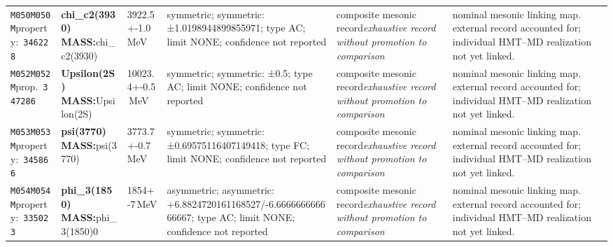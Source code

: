 \begin{landscape}
\begin{longtable}{L{1.85cm}L{4.45cm}L{2.35cm}L{4.05cm}L{3.35cm}L{7.15cm}}
\texttt{M050}\newline \texttt{M050M}\newline property:\ \texttt{346228} & \textbf{chi\_\allowbreak{}c2(3930) MASS:}\newline chi\_\allowbreak{}c2(3930) & 3922.5+-1.0\,MeV & symmetric; symmetric: ±1.0198944899855971; type AC; limit NONE; confidence not reported & composite mesonic record\newline \emph{exhaustive record without promotion to comparison} & nominal mesonic linking map. external record accounted for; individual HMT--MD realization not yet linked. \\
\texttt{M052}\newline \texttt{M052M}\newline prop.\ \texttt{347286} & \textbf{Upsilon(2S) MASS:}\newline Upsilon(2S) & 10023.4+-0.5\,MeV & symmetric; symmetric: ±0.5; type AC; limit NONE; confidence not reported & composite mesonic record\newline \emph{exhaustive record without promotion to comparison} & nominal mesonic linking map. external record accounted for; individual HMT--MD realization not yet linked. \\
\texttt{M053}\newline \texttt{M053M}\newline property:\ \texttt{345866} & \textbf{psi(3770) MASS:}\newline psi(3770) & 3773.7+-0.7\,MeV & symmetric; symmetric: ±0.69575116407149418; type FC; limit NONE; confidence not reported & composite mesonic record\newline \emph{exhaustive record without promotion to comparison} & nominal mesonic linking map. external record accounted for; individual HMT--MD realization not yet linked. \\
\texttt{M054}\newline \texttt{M054M}\newline property:\ \texttt{335023} & \textbf{phi\_\allowbreak{}3(1850) MASS:}\newline phi\_\allowbreak{}3(1850)0 & 1854+-7\,MeV & asymmetric; asymmetric: +6.8824720161168527/-6.666666666666667; type AC; limit NONE; confidence not reported & composite mesonic record\newline \emph{exhaustive record without promotion to comparison} & nominal mesonic linking map. external record accounted for; individual HMT--MD realization not yet linked. \\

\end{longtable}
\end{landscape}

